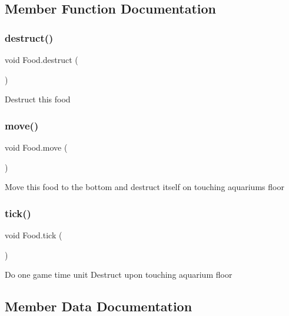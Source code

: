 \subsection{Member Function Documentation}
\mbox{\label{class_food_abe0571a139d7366a88e117aef6042e92}} 
\subsubsection{\texorpdfstring{destruct()}{destruct()}}
{\footnotesize\ttfamily void Food.\+destruct (\begin{DoxyParamCaption}{ }\end{DoxyParamCaption})\hspace{0.3cm}{\ttfamily [inline]}}

Destruct this food \mbox{\label{class_food_a38349e35951c1eadc9d886a687d23e4b}} 
\subsubsection{\texorpdfstring{move()}{move()}}
{\footnotesize\ttfamily void Food.\+move (\begin{DoxyParamCaption}{ }\end{DoxyParamCaption})\hspace{0.3cm}{\ttfamily [inline]}}

Move this food to the bottom and destruct itself on touching aquarium\textquotesingle{}s floor \mbox{\label{class_food_ab522a31e92238355e7d3749228e5051d}} 
\subsubsection{\texorpdfstring{tick()}{tick()}}
{\footnotesize\ttfamily void Food.\+tick (\begin{DoxyParamCaption}{ }\end{DoxyParamCaption})\hspace{0.3cm}{\ttfamily [inline]}}

Do one game time unit Destruct upon touching aquarium floor 

\subsection{Member Data Documentation}
\mbox{\label{class_food_ad3de4a04ccb2fac1edbd3e02d07f7773}} 
